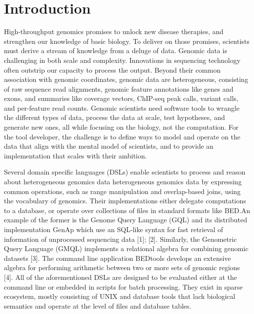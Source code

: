 \documentclass[10pt,letterpaper]{article}
\begin{document}
\linenumbers

\section{Introduction}\label{introduction}

High-throughput genomics promises to unlock new disease therapies, and
strengthen our knowledge of basic biology. To deliver on those promises,
scientists must derive a stream of knowledge from a deluge of data.
Genomic data is challenging in both scale and complexity. Innovations in
sequencing technology often outstrip our capacity to process the output.
Beyond their common association with genomic coordinates, genomic data
are heterogeneous, consisting of raw sequence read alignments, genomic
feature annotations like genes and exons, and summaries like coverage
vectors, ChIP-seq peak calls, variant calls, and per-feature read
counts. Genomic scientists need software tools to wrangle the different
types of data, process the data at scale, test hypotheses, and generate
new ones, all while focusing on the biology, not the computation. For
the tool developer, the challenge is to define ways to model and operate
on the data that align with the mental model of scientists, and to
provide an implementation that scales with their ambition.

Several domain specific languages (DSLs) enable scientists to process
and reason about heterogeneous genomics data heterogeneous genomics data
by expressing common operations, such as range manipulation and
overlap-based joins, using the vocabulary of genomics. Their
implementations either delegate computations to a database, or operate
over collections of files in standard formats like BED.An example of the
former is the Genome Query Language (GQL) and its distributed
implementation GenAp which use an SQL-like syntax for fast retrieval of
information of unprocessed sequencing data {[}1{]}; {[}2{]}. Similarly,
the Genometric Query Language (GMQL) implements a relational algebra for
combining genomic datasets {[}3{]}. The command line application
BEDtools develops an extensive algebra for performing arithmetic between
two or more sets of genomic regions {[}4{]}. All of the aforementioned
DSLs are designed to be evaluated either at the command line or embedded
in scripts for batch processing. They exist in sparse ecosystem, mostly
consisting of UNIX and database tools that lack biological semantics and
operate at the level of files and database tables.
\end{document}

